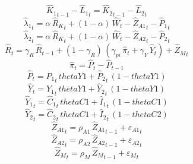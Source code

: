 \begin{dmath}
{{\hat{K}_{1}}}_{t-1}-{{\hat{L}_{1}}}_{t}={{\hat{K}_{2}}}_{t-1}-{{\hat{L}_{2}}}_{t}
\end{dmath}
\begin{dmath}
{{\hat{\lambda}_{1}}}_{t}={{\alpha}}\, {{\hat{R}_{K}}}_{t}+\left(1-{{\alpha}}\right)\, {{\hat{W}}}_{t}-{{\hat{Z}_{A1}}}_{t}-{{\hat{P}_{1}}}_{t}
\end{dmath}
\begin{dmath}
{{\hat{\lambda}_{2}}}_{t}={{\alpha}}\, {{\hat{R}_{K}}}_{t}+\left(1-{{\alpha}}\right)\, {{\hat{W}}}_{t}-{{\hat{Z}_{A2}}}_{t}-{{\hat{P}_{2}}}_{t}
\end{dmath}
\begin{dmath}
{{\hat{R}}}_{t}={{\gamma_{R}}}\, {{\hat{R}}}_{t-1}+\left(1-{{\gamma_{R}}}\right)\, \left({{\gamma_{pi}}}\, {{\hat{\pi}}}_{t}+{{\gamma_{Y}}}\, {{\hat{Y}}}_{t}\right)+{{\hat{Z}_M}}_{t}
\end{dmath}
\begin{dmath}
{{\hat{\pi}}}_{t}={{\hat{P}}}_{t}-{{\hat{P}}}_{t-1}
\end{dmath}
\begin{dmath}
{{\hat{P}}}_{t}={{\hat{P}_{1}}}_{t}\, {thetaY1}+{{\hat{P}_{2}}}_{t}\, \left(1-{thetaY1}\right)
\end{dmath}
\begin{dmath}
{{\hat{Y}}}_{t}={{\hat{Y}_{1}}}_{t}\, {thetaY1}+{{\hat{Y}_{2}}}_{t}\, \left(1-{thetaY1}\right)
\end{dmath}
\begin{dmath}
{{\hat{Y}_{1}}}_{t}={{\hat{C}_{1}}}_{t}\, {thetaC1}+{{\hat{I}_{1}}}_{t}\, \left(1-{thetaC1}\right)
\end{dmath}
\begin{dmath}
{{\hat{Y}_{2}}}_{t}={{\hat{C}_{2}}}_{t}\, {thetaC1}+{{\hat{I}_{2}}}_{t}\, \left(1-{thetaC2}\right)
\end{dmath}
\begin{dmath}
{{\hat{Z}_{A1}}}_{t}={{\rho_{A1}}}\, {{\hat{Z}_{A1}}}_{t-1}+{{\varepsilon_{A1}}}_{t}
\end{dmath}
\begin{dmath}
{{\hat{Z}_{A2}}}_{t}={{\rho_{A2}}}\, {{\hat{Z}_{A2}}}_{t-1}+{{\varepsilon_{A2}}}_{t}
\end{dmath}
\begin{dmath}
{{\hat{Z}_M}}_{t}={{\rho_{M}}}\, {{\hat{Z}_M}}_{t-1}+{{\varepsilon_{M}}}_{t}
\end{dmath}
